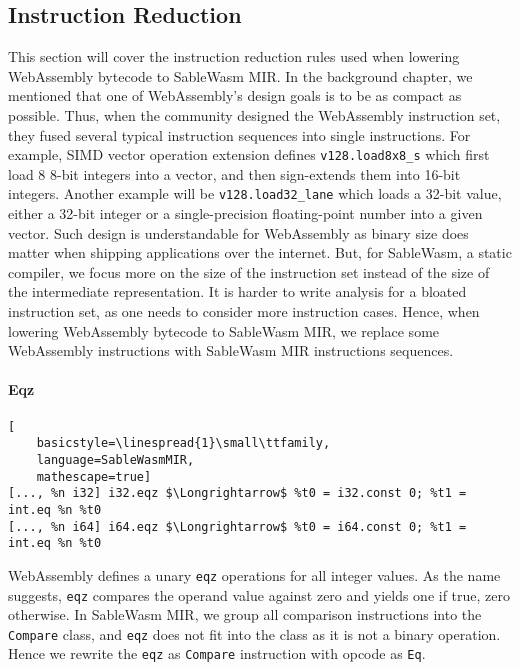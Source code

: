 \subsection{Instruction Reduction}
\label{section:mir-translation-inst-reduction}

This section will cover the instruction reduction rules used when lowering
WebAssembly bytecode to SableWasm MIR. In the background chapter, we mentioned
that one of WebAssembly's design goals is to be as compact as possible. Thus,
when the community designed the WebAssembly instruction set, they fused several
typical instruction sequences into single instructions. For example, SIMD vector
operation extension defines \texttt{v128.load8x8\_s} which first load 8
8-bit integers into a vector, and then sign-extends them into 16-bit
integers. Another example will be \texttt{v128.load32\_lane} which loads a
32-bit value, either a 32-bit integer or a single-precision floating-point
number into a given vector. Such design is understandable for WebAssembly as
binary size does matter when shipping applications over the internet. But, for
SableWasm, a static compiler, we focus more on the size of the instruction set
instead of the size of the intermediate representation. It is harder to write
analysis for a bloated instruction set, as one needs to consider more
instruction cases. Hence, when lowering WebAssembly bytecode to SableWasm MIR,
we replace some WebAssembly instructions with SableWasm MIR instructions
sequences.

\paragraph{Eqz} \quad
\begin{lstlisting}[
    basicstyle=\linespread{1}\small\ttfamily, 
    language=SableWasmMIR, 
    mathescape=true]
[..., %n i32] i32.eqz $\Longrightarrow$ %t0 = i32.const 0; %t1 = int.eq %n %t0
[..., %n i64] i64.eqz $\Longrightarrow$ %t0 = i64.const 0; %t1 = int.eq %n %t0
\end{lstlisting}
WebAssembly defines a unary \texttt{eqz} operations for all integer values. As
the name suggests, \texttt{eqz} compares the operand value against zero and
yields one if true, zero otherwise. In SableWasm MIR, we group all comparison
instructions into the \texttt{Compare} class, and \texttt{eqz} does not fit into
the class as it is not a binary operation. Hence we rewrite the \texttt{eqz} as
\texttt{Compare} instruction with opcode as \texttt{Eq}.

